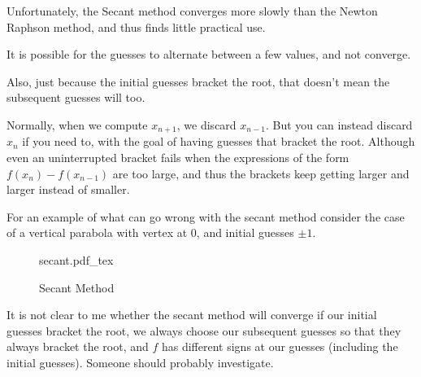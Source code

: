 Unfortunately, the Secant method converges more slowly than the Newton Raphson method, and thus finds little practical use.

It is possible for the guesses to alternate between a few values, and not converge.

Also, just because the initial guesses bracket the root, that doesn't mean the subsequent guesses will too.

Normally, when we compute $x_{n+1}$, we discard $x_{n-1}$. But you can instead discard $x_n$ if you need to, with the goal of having guesses that bracket the root. Although even an uninterrupted bracket fails when the expressions of the form $f(x_n) - f(x_{n-1})$ are too large, and thus the brackets keep getting larger and larger instead of smaller.

For an example of what can go wrong with the secant method consider the case of a vertical parabola with vertex at 0, and initial guesses $\pm 1$.

\begin{figure}[H]
	\centering
	\def\svgwidth{0.8\textwidth}
	{secant.pdf_tex}
	\caption{Secant Method}
	\label{fig1:feb28A}
\end{figure}

It is not clear to me whether the secant method will converge if our initial guesses bracket the root, we always choose our subsequent guesses so that they always bracket the root, and $f$ has different signs at our guesses (including the initial guesses). Someone should probably investigate.

